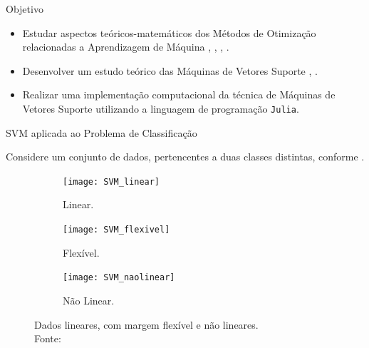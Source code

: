 \documentclass{beamer}
\theoremstyle{definition}%
\begin{document}
\begin{frame}{Objetivo}
\begin{itemize}
	\item Estudar aspectos teóricos-matemáticos dos Métodos de Otimização relacionadas a Aprendizagem de Máquina \cite{Ana1994}, \cite{Solodov2014}, \cite{Izmailov2014}, \cite{Ademir2013}.

	\item Desenvolver um estudo teórico das Máquinas de Vetores Suporte \cite{Faisal2019}, \cite{Evelin2017}.

	\item Realizar uma implementação computacional da técnica de Máquinas de Vetores Suporte utilizando a linguagem de programação  \texttt{Julia}.
\end{itemize}
\end{frame}


\begin{frame}{SVM aplicada ao Problema de Classificação}

Considere um conjunto de dados, pertencentes a duas classes distintas, conforme .

\begin{figure}[!h] 
	\centering
	\begin{subfigure}[h]{0.3\textwidth}
		\centering
		\texttt{[image: SVM\_linear]}
		\caption{Linear. \label{fig1:a}}
	\end{subfigure}
	\begin{subfigure}[!h]{0.3\textwidth}
		\centering
		\texttt{[image: SVM\_flexivel]}
		\caption{Flexível. \label{fig1:b}}
	\end{subfigure}
	\begin{subfigure}[!h]{0.3\textwidth}
		\centering
		\texttt{[image: SVM\_naolinear]}
		\caption{Não Linear. \label{fig1:c}}
	\end{subfigure}
	\caption{Dados lineares, com margem flexível e não lineares. \label{fig1}\\ Fonte: \textcite{Evelin2017}}
\end{figure}
\end{frame}
\end{document}
